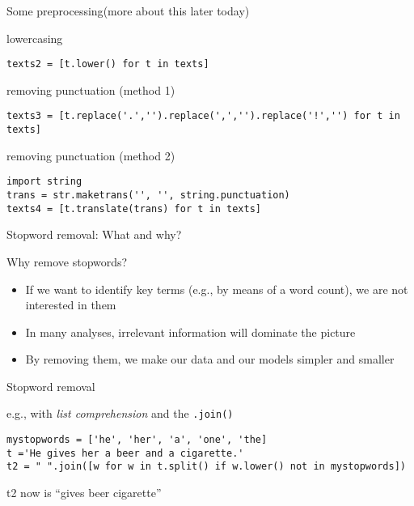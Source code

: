 \documentclass[compress]{beamer}
\begin{document}
\begin{frame}[fragile]{Some preprocessing}{(more about this later today)}


lowercasing
\begin{lstlisting}
texts2 = [t.lower() for t in texts]
\end{lstlisting}

removing punctuation (method 1)
\begin{lstlisting}
texts3 = [t.replace('.','').replace(',','').replace('!','') for t in texts]   
\end{lstlisting}

removing punctuation (method 2)
\begin{lstlisting}
import string
trans = str.maketrans('', '', string.punctuation)
texts4 = [t.translate(trans) for t in texts]   
\end{lstlisting}
\end{frame}





\begin{frame}{Stopword removal: What and why?}
\begin{block}{Why remove stopwords?}
\begin{itemize}
\item If we want to identify key terms (e.g., by means of a word count), we are not interested in them
\item In many analyses, irrelevant information will dominate the picture
\item By removing them, we make our data and our models simpler and smaller
\end{itemize}
\end{block}
\end{frame}


\begin{frame}[fragile]{Stopword removal}

e.g., with \textit{list comprehension} and the \texttt{.join()}

\begin{lstlisting}
mystopwords = ['he', 'her', 'a', 'one', 'the]
t ='He gives her a beer and a cigarette.'
t2 = " ".join([w for w in t.split() if w.lower() not in mystopwords])
\end{lstlisting}

t2 now is ``gives beer cigarette''

\end{frame}
\end{document}
